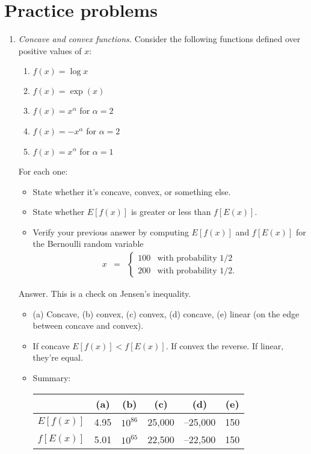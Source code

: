 \documentclass[11pt]{article}
\begin{document}
\section*{Practice problems}

\begin{enumerate}
\item  {\it Concave and convex functions.\/}
Consider the following functions defined over positive values of $x$:
%
\begin{enumerate}
\item $f(x) = \log x$
\item $f(x) = \exp(x) $
\item $f(x) = x^{\alpha}$ for $\alpha = 2$
\item $f(x) = - x^{\alpha}$ for $\alpha = 2$
\item $f(x) = x^{\alpha} $ for $\alpha = 1$
\end{enumerate}
For each one:
\begin{itemize}
\item State whether it's concave, convex, or something else.
\item State whether $ E[f(x)]$ is greater or less than $f[E(x)]$.
\item Verify your previous answer by computing
 $ E[f(x)]$ and $f[E(x)]$
 for the Bernoulli random variable
\begin{eqnarray*}
    x &=& \left\{
            \begin{array}{ll}
            100   & \mbox{with probability } 1/2 \\
            200 & \mbox{with probability }   1/2 .
            \end{array}
            \right.
\end{eqnarray*}
\end{itemize}

Answer.
This is a check on Jensen's inequality.
\begin{itemize}
\item (a) Concave, (b) convex, (c) convex, (d) concave, (e) linear
(on the edge between concave and convex).
\item If concave $ E[f(x)] < f[E(x)]$.  If convex the reverse.
If linear, they're equal.
\item Summary: \\
\begin{center}
\begin{tabular}{lccccc}
\toprule
        & (a) & (b) & (c) & (d) & (e) \\
\midrule
$E[f(x)]$ & 4.95 & $10^{86}$ & 25,000 & --25,000 & 150 \\
$f[E(x)]$ & 5.01 & $10^{65}$ & 22,500 & --22,500 & 150 \\
\bottomrule
\end{tabular}
\end{center}
\end{itemize}
\bigskip


\end{enumerate}
\end{document}
